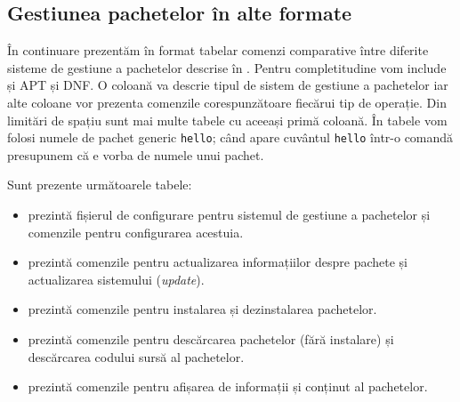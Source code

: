 \subsection{Gestiunea pachetelor în alte formate}
\label{sec:package:other}

În continuare prezentăm în format tabelar comenzi comparative între diferite sisteme de gestiune a pachetelor descrise în .
Pentru completitudine vom include și APT și DNF.
O coloană va descrie tipul de sistem de gestiune a pachetelor iar alte coloane vor prezenta comenzile corespunzătoare fiecărui tip de operație.
Din limitări de spațiu sunt mai multe tabele cu aceeași primă coloană.
În tabele vom folosi numele de pachet generic \texttt{hello};
când apare cuvântul \texttt{hello} într-o comandă presupunem că e vorba de numele unui pachet.

Sunt prezente următoarele tabele:
\begin{itemize}
  \item {} prezintă fișierul de configurare pentru sistemul de gestiune a pachetelor și comenzile pentru configurarea acestuia.
  \item {} prezintă comenzile pentru actualizarea informațiilor despre pachete și actualizarea sistemului (\textit{update}).
  \item {} prezintă comenzile pentru instalarea și dezinstalarea pachetelor.
  \item {} prezintă comenzile pentru descărcarea pachetelor (fără instalare) și descărcarea codului sursă al pachetelor.
  \item {} prezintă comenzile pentru afișarea de informații și conținut al pachetelor.
\end{itemize}

